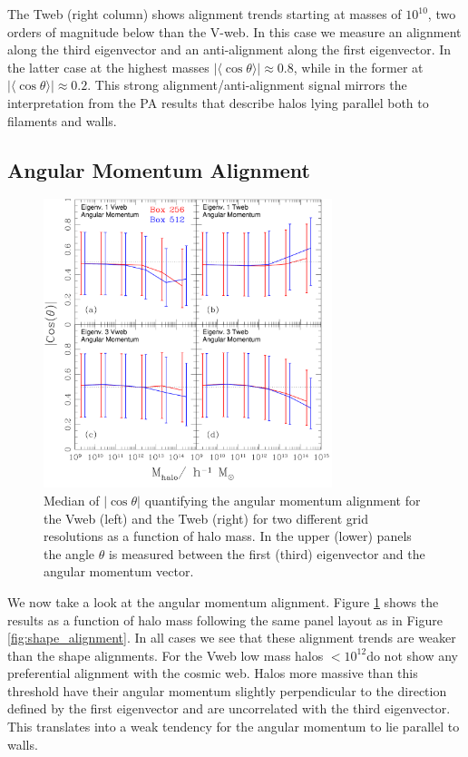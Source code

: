 \documentclass[useAMS,usenatbib]{mn2e}
\newcommand{\hMsun}{{\ifmmode{h^{-1}{\rm
        {M_{\odot}}}}\else{$h^{-1}{\rm{M_{\odot}}}$~}\fi}}
\newcommand{\muavg}{\vert\langle\cos\theta\rangle\vert}
\begin{document}
The Tweb (right column) shows alignment trends starting at masses of
$10^{10}$\hMsun, two orders of magnitude below than the V-web. In this
case we measure an alignment along the third eigenvector and an
anti-alignment along the first eigenvector. In the latter case at the
highest masses $\muavg\approx 0.8$, while in the former at $\muavg\approx
0.2$. This strong alignment/anti-alignment signal mirrors the
interpretation from the PA results that describe halos lying parallel
both to filaments and walls.


\subsection{Angular Momentum Alignment}

\begin{figure}
\includegraphics[width=0.75\textwidth]{Fig3.pdf}
\caption{Median of $|\cos\theta|$ quantifying the angular momentum
  alignment for the Vweb (left) and the Tweb (right) for two different
  grid resolutions as a function of halo mass. In the upper (lower)
  panels the angle $\theta$ is measured between the first (third)
  eigenvector and the angular momentum
  vector.\label{fig:spin_alignment}} 
\end{figure}


We now take a look at the angular momentum alignment. Figure
\ref{fig:spin_alignment} shows the results as a function of halo mass
following the same panel layout as in Figure
\ref{fig:shape_alignment}. In all cases we see that these alignment
trends are weaker than the shape alignments. For the Vweb low mass halos
$<10^{12}$\hMsun do not show any preferential alignment with the
cosmic web. Halos more massive than this threshold have their angular
momentum slightly perpendicular to the direction defined by the first
eigenvector and are uncorrelated with the third eigenvector. This translates
into a weak tendency for the angular momentum to lie parallel to walls.
\end{document}
